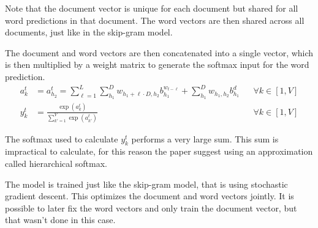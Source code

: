 Note that the document vector is unique for each document but shared for all word predictions in that document. The word vectors are then shared across all documents, just like in the skip-gram model.

The document and word vectors are then concatenated into a single vector, which is then multiplied by a weight matrix to generate the softmax input for the word prediction.
\begin{equation}
\begin{aligned}
a_{k}^t &= a_{h_2}^t = \sum_{\ell=1}^L \sum_{h_1}^D w_{h_1 + \ell \cdot D, h_2} b_{h_1}^{w_{t - \ell}} + \sum_{h_1}^D w_{h_1, h_2} b_{h_1}^d && \forall k \in [1, V] \\
y_{k}^t &= \frac{\exp(a_k^t)}{\sum_{k'=1}^V \exp(a_{k'}^t)} && \forall k \in [1, V]
\end{aligned}
\end{equation}

The softmax used to calculate $y_{k}^t$ performs a very large sum. This sum is impractical to calculate, for this reason the paper \cite{doc2vec} suggest using an approximation called hierarchical softmax.

The model is trained just like the skip-gram model, that is using stochastic gradient descent. This optimizes the document and word vectors jointly. It is possible to later fix the word vectors and only train the document vector, but that wasn't done in this case.
